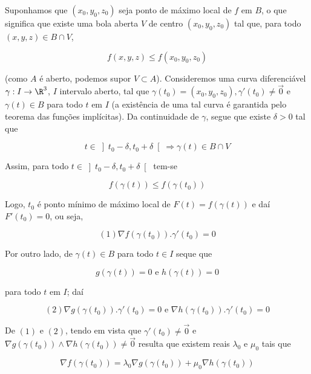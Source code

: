 \documentclass[11pt, oneside, a4paper]{gsm-l}
\begin{document}
\begin{dem}
Suponhamos que $\left( {x_0 ,y_0 ,z_0 } \right)$ seja ponto de máximo local de $f$ em $B$, o que significa que existe uma bola aberta $V$ de centro $\left( {x_0 ,y_0 ,z_0 } \right)$ tal que, para todo $\left( {x,y,z} \right) \in B \cap V$,

\[
f\left( {x,y,z} \right) \leqslant f\left( {x_0 ,y_0 ,z_0 } \right)
\]

(como $A$ é aberto, podemos supor $V \subset A$). Consideremos uma curva diferenciável $\gamma :I \to \R^3$, $I$ intervalo aberto, tal que $\gamma \left( {t_0 } \right) = \left( {x_0 ,y_0 ,z_0 } \right),\gamma '\left( {t_0 } \right) \ne \overrightarrow 0$ e $\gamma \left( t \right) \in B$ para todo $t$ em $I$ (a exist\^encia de uma tal curva é garantida pelo teorema das funções implícitas). Da continuidade de $\gamma$, segue que existe $\delta > 0$ tal que

\[
t \in \left] {t_0  - \delta ,t_0  + \delta } \right[ \Rightarrow \gamma \left( t \right) \in B \cap V
\]

Assim, para todo $t \in \left] {t_0  - \delta ,t_0  + \delta } \right[$ tem-se

\[
f\left( {\gamma \left( t \right)} \right) \leqslant f\left( {\gamma \left( {t_0 } \right)} \right)
\]

Logo, $t_0$ é ponto mínimo de máximo local de $F\left( t \right) = f\left( {\gamma \left( t \right)} \right)$ e daí $F'\left( {t_0 } \right) = 0$, ou seja,

\[
\left( 1 \right)\nabla f\left( {\gamma \left( {t_0 } \right)} \right).\gamma '\left( {t_0 } \right) = 0
\]

Por outro lado, de $\gamma \left( t \right) \in B$ para todo $t \in I$ seque que

\[
g\left( {\gamma \left( t \right)} \right) = 0{\text{ e }}h\left( {\gamma \left( t \right)} \right) = 0
\]

para todo $t$ em $I$; daí

\[
\left( 2 \right)\nabla g\left( {\gamma \left( {t_0 } \right)} \right).\gamma '\left( {t_0 } \right) = 0{\text{ e }}\nabla h\left( {\gamma \left( {t_0 } \right)} \right).\gamma '\left( {t_0 } \right) = 0
\]

De $(1)$ e $(2)$, tendo em vista que $\gamma '\left( {t_0 } \right) \ne \overrightarrow 0$ e $\nabla g\left( {\gamma \left( {t_0 } \right)} \right) \wedge \nabla h\left( {\gamma \left( {t_0 } \right)} \right) \ne \overrightarrow 0$ resulta que existem reais $\lambda _0$ e $\mu _0$ tais que

\[
\nabla f\left( {\gamma \left( {t_0 } \right)} \right) = \lambda _0 \nabla g\left( {\gamma \left( {t_0 } \right)} \right) + \mu _0 \nabla h\left( {\gamma \left( {t_0 } \right)} \right)
\]


\end{dem}
\end{document}

